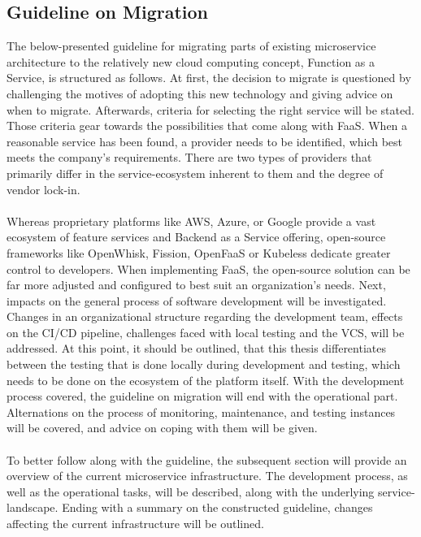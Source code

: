 \documentclass[a4paper,11pt, pagesize]{scrartcl}
\begin{document}
\begin{spacing}{1.2}
\newpage




\section{Guideline on Migration}
The below-presented guideline for migrating parts of existing microservice architecture to the relatively new cloud computing concept, Function as a Service, is structured as follows. At first, the decision to migrate is questioned by challenging the motives of adopting this new technology and giving advice on when to migrate. Afterwards, criteria for selecting the right service will be stated. Those criteria gear towards the possibilities that come along with FaaS. When a reasonable service has been found, a provider needs to be identified, which best meets the company's requirements. There are two types of providers that primarily differ in the service-ecosystem inherent to them and the degree of vendor lock-in. \\\\Whereas proprietary platforms like AWS, Azure, or Google provide a vast ecosystem of feature services and Backend as a Service offering, open-source frameworks like OpenWhisk, Fission, OpenFaaS or Kubeless dedicate greater control to developers. When implementing FaaS, the open-source solution can be far more adjusted and configured to best suit an organization's needs. Next, impacts on the general process of software development will be investigated. Changes in an organizational structure regarding the development team, effects on the CI/CD pipeline, challenges faced with local testing and the VCS, will be addressed. At this point, it should be outlined, that this thesis differentiates between the testing that is done locally during development and testing, which needs to be done on the ecosystem of the platform itself. With the development process covered, the guideline on migration will end with the operational part. Alternations on the process of monitoring, maintenance, and testing instances will be covered, and advice on coping with them will be given.\\\\ To better follow along with the guideline, the subsequent section will provide an overview of the current microservice infrastructure. The development process, as well as the operational tasks, will be described, along with the underlying service-landscape. Ending with a summary on the constructed guideline, changes affecting the current infrastructure will be outlined.

\end{spacing}
\end{document}

